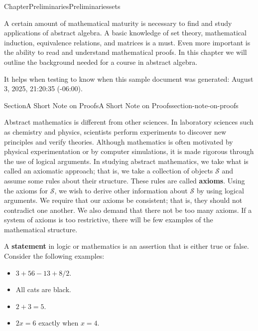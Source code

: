 \documentclass[oneside,10pt,]{book}
\newcommand{\terminology}[1]{\textbf{#1}}
\numberwithin{equation}{section}
\begin{document}
\begin{chapterptx}{Chapter}{Preliminaries}{}{Preliminaries}{}{}{sets}
\renewcommand*{\chaptername}{Chapter}
\begin{introduction}{}%
A certain amount of mathematical maturity is necessary to find and study applications of abstract algebra.  A basic knowledge of set theory, mathematical induction, equivalence relations, and matrices is a must.  Even more important is the ability to read and understand mathematical proofs.  In this chapter we will outline the background needed for a course in abstract algebra.%
\par
It helps when testing to know when this sample document was generated: August 3, 2025, 21:20:35 (-06:00).%
\end{introduction}%
%
%
\typeout{************************************************}
\typeout{************************************************}
%
\begin{sectionptx}{Section}{A Short Note on Proofs}{}{A Short Note on Proofs}{}{}{section-note-on-proofs}
\begin{introduction}{}%
Abstract mathematics is different from other sciences. In laboratory sciences such as chemistry and physics, scientists perform experiments to discover new principles and verify theories.  Although mathematics is often motivated by physical experimentation or by computer simulations, it is made rigorous through the use of logical arguments.  In studying abstract mathematics, we take what is called an  axiomatic approach; that is, we take a collection of objects \(\mathcal S\) and assume some rules about their structure.  These rules are called \terminology{axioms}.  Using the axioms for \(\mathcal S\), we wish to derive other information about \(\mathcal S\) by using logical arguments.  We require that our axioms be consistent; that is, they should not contradict one another.  We also demand that there not be too many axioms. If a system of axioms is too restrictive,  there will be few examples of the mathematical structure.%
\par
A \terminology{statement} in logic or mathematics is an assertion that is either true or false.  Consider the following examples:%
\begin{itemize}[label=\textbullet]
\item{}\(3 + 56 - 13 + 8/2 \).%
\item{}All cats are black.%
\item{}\(2 + 3 = 5\).%
\item{}\(2x = 6\) exactly when \(x = 4\).%

\end{itemize}
\end{introduction}
\end{sectionptx}
\end{chapterptx}
\end{document}
